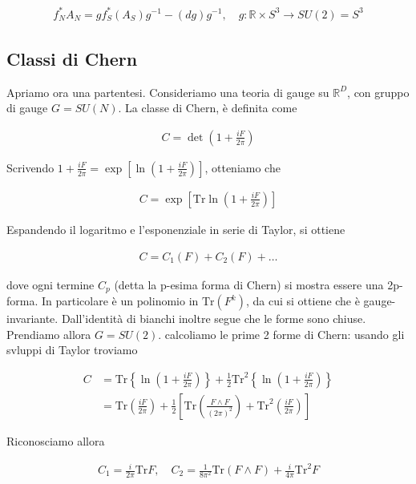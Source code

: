 \documentclass{report}
\begin{document}
\begin{align}
    f_N^*A_N = gf_S^*(A_S)g^{-1} - (dg)g^{-1}, \quad g : \mathbb{R} \times S^3 \rightarrow SU(2) = S^3
\end{align}

\subsection{Classi di Chern}

Apriamo ora una partentesi. Consideriamo una teoria di gauge su \(\mathbb{R}^D\), con gruppo di gauge \(G = SU(N)\). La classe di Chern, è definita come 

\begin{align}
    C = \det\left(1 + \frac{iF}{2\pi} \right)    
\end{align}

Scrivendo \(1 + \frac{iF}{2\pi} = \exp\left[\ln\left(1 + \frac{iF}{2\pi}\right)\right]\), otteniamo che 

\begin{align}
    C = \exp\left[\text{Tr}\ln\left(1 + \frac{iF}{2\pi}\right)\right]
\end{align}

Espandendo il logaritmo e l'esponenziale in serie di Taylor, si ottiene 

\begin{align}
    C = C_1(F) + C_2(F) + \ldots 
\end{align}

dove ogni termine \(C_p\) (detta la p-esima forma di Chern) si mostra essere una 2p-forma. In particolare è un polinomio in \(\text{Tr}(F^k)\), da cui si ottiene che è gauge-invariante. Dall'identità di bianchi inoltre segue che le forme sono chiuse. \\

Prendiamo allora \(G = SU(2)\). calcoliamo le prime 2 forme di Chern: usando gli svluppi di Taylor troviamo 

\begin{align}
    C &= \text{Tr}\left\{\ln\left(1 + \frac{iF}{2\pi} \right) \right\} + \frac{1}{2}\text{Tr}^2\left\{\ln\left(1 + \frac{iF}{2\pi} \right) \right\} \\
    &= \text{Tr}\left(\frac{iF}{2\pi} \right) + \frac{1}{2}\left[\text{Tr}\left(\frac{F \wedge F}{(2\pi)^2}\right) + \text{Tr}^2\left(\frac{iF}{2\pi}\right)\right]
\end{align}

Riconosciamo allora 

\begin{align}
    C_1 = \frac{i}{2\pi}\text{Tr}F, \quad C_2 = \frac{1}{8\pi^2}\text{Tr}(F\wedge F) + \frac{i}{4\pi}\text{Tr}^2 F
\end{align}
\end{document}

